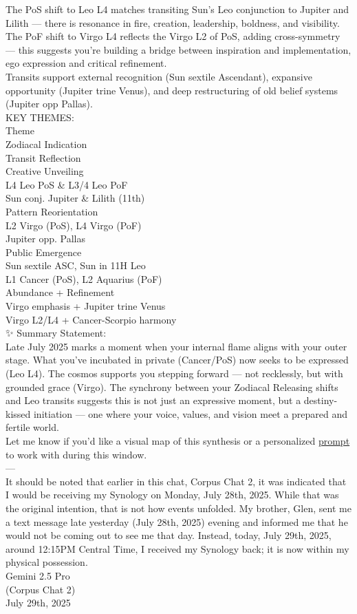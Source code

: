 \documentclass{article}
\begin{document}
The PoS shift to Leo L4 matches transiting Sun's Leo conjunction to Jupiter and Lilith --- there is resonance in fire, creation, leadership, boldness, and visibility.\\
The PoF shift to Virgo L4 reflects the Virgo L2 of PoS, adding cross-symmetry --- this suggests you're building a bridge between inspiration and implementation, ego expression and critical refinement.\\
Transits support external recognition (Sun sextile Ascendant), expansive opportunity (Jupiter trine Venus), and deep restructuring of old belief systems (Jupiter opp Pallas).\\
KEY THEMES:\\
Theme\\
Zodiacal Indication\\
Transit Reflection\\
Creative Unveiling\\
L4 Leo PoS \& L3/4 Leo PoF\\
Sun conj. Jupiter \& Lilith (11th)\\
Pattern Reorientation\\
L2 Virgo (PoS), L4 Virgo (PoF)\\
Jupiter opp. Pallas\\
Public Emergence\\
Sun sextile ASC, Sun in 11H Leo\\
L1 Cancer (PoS), L2 Aquarius (PoF)\\
Abundance + Refinement\\
Virgo emphasis + Jupiter trine Venus\\
Virgo L2/L4 + Cancer-Scorpio harmony\\
✨ Summary Statement:\\
Late July 2025 marks a moment when your internal flame aligns with your outer stage. What you've incubated in private (Cancer/PoS) now seeks to be expressed (Leo L4). The cosmos supports you stepping forward --- not recklessly, but with grounded grace (Virgo). The synchrony between your Zodiacal Releasing shifts and Leo transits suggests this is not just an expressive moment, but a destiny-kissed initiation --- one where your voice, values, and vision meet a prepared and fertile world.\\
Let me know if you'd like a visual map of this synthesis or a personalized \hyperlink{gloss:prompt}{prompt} to work with during this window.\\
---\\
It should be noted that earlier in this chat, Corpus Chat 2, it was indicated that I would be receiving my Synology on Monday, July 28th, 2025. While that was the original intention, that is not how events unfolded. My brother, Glen, sent me a text message late yesterday (July 28th, 2025) evening and informed me that he would not be coming out to see me that day. Instead, today, July 29th, 2025, around 12:15PM Central Time, I received my Synology back; it is now within my physical possession.\\
Gemini 2.5 Pro\\
(Corpus Chat 2)\\
July 29th, 2025
\end{document}
